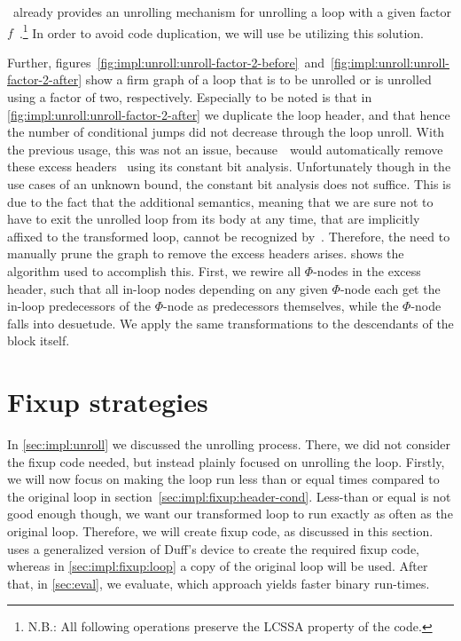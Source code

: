 \libFIRM~already provides an unrolling mechanism for unrolling a loop with a given factor $f$~\cite{aebi18bachelorarbeit}.\footnote{N.B.: All following operations preserve the LCSSA property of the code.}
In order to avoid code duplication, we will use be utilizing this solution.

Further, figures~\ref{fig:impl:unroll:unroll-factor-2-before}~and~\ref{fig:impl:unroll:unroll-factor-2-after} show a firm graph of a loop that is to be unrolled or is unrolled using a factor of two, respectively.
Especially to be noted is that in \cref{fig:impl:unroll:unroll-factor-2-after} we duplicate the loop header, and that hence the number of conditional jumps did not decrease through the loop unroll.
With the previous usage, this was not an issue, because~\libFIRM~would automatically remove these excess headers~\cite{aebi18bachelorarbeit} using its constant bit analysis.
Unfortunately though in the use cases of an unknown bound, the constant bit analysis does not suffice.
This is due to the fact that the additional semantics, meaning that we are sure not to have to exit the unrolled loop from its body at any time, that are implicitly affixed to the transformed loop, cannot be recognized by~\libFIRM.
Therefore, the need to manually prune the graph to remove the excess headers arises.
 shows the algorithm used to accomplish this.
First, we rewire all $\Phi$-nodes in the excess header, such that all in-loop nodes depending on any given $\Phi$-node each get the in-loop predecessors of the $\Phi$-node as predecessors themselves, while the $\Phi$-node falls into desuetude.
We apply the same transformations to the descendants of the block itself.







\newpage

\section{Fixup strategies}\label{sec:impl:fixup}

In \cref{sec:impl:unroll} we discussed the unrolling process.
There, we did not consider the fixup code needed, but instead plainly focused on unrolling the loop.
Firstly, we will now focus on making the loop run less than or equal times compared to the original loop in section~\cref{sec:impl:fixup:header-cond}.
Less-than or equal is not good enough though, we want our transformed loop to run exactly as often as the original loop.
Therefore, we will create fixup code, as discussed in this section.
 uses a generalized version of Duff's device to create the required fixup code, whereas in \cref{sec:impl:fixup:loop} a copy of the original loop will be used.
After that, in \cref{sec:eval}, we evaluate, which approach yields faster binary run-times.

